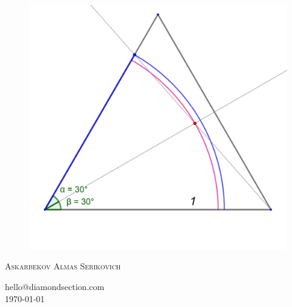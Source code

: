 \documentclass[12pt, letterpaper, oneside]{report}
\begin{document}
\begin{titlepage}
\begin{figure}[h]
\centerline{\includegraphics[scale=0.2]{images/ds_tr.jpg}}

\label{logo}
\end{figure}
\textsc{\LARGE Askarbekov Almas Serikovich }\\[1.5cm]
\begin{center}
	\large {hello@diamondsection.com}\\
	\today
\end{center}
\end{titlepage}
\end{document}
